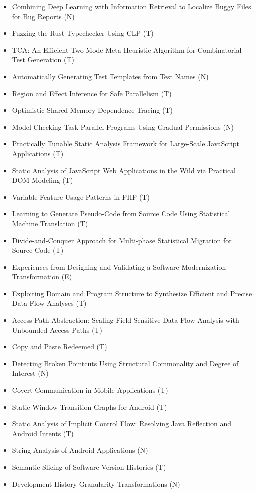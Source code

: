 {\begin{itemize}[itemsep=-1ex]
  \item Combining Deep Learning with Information Retrieval to Localize Buggy Files for Bug Reports (N)
  \item Fuzzing the Rust Typechecker Using CLP (T)
  \item TCA: An Efficient Two-Mode Meta-Heuristic Algorithm for Combinatorial Test Generation (T)
  \item Automatically Generating Test Templates from Test Names (N)
  \item Region and Effect Inference for Safe Parallelism (T)
  \item Optimistic Shared Memory Dependence Tracing (T)
  \item Model Checking Task Parallel Programs Using Gradual Permissions (N)
  \item Practically Tunable Static Analysis Framework for Large-Scale JavaScript Applications (T)
  \item Static Analysis of JavaScript Web Applications in the Wild via Practical DOM Modeling (T)
  \item Variable Feature Usage Patterns in PHP (T)
  \item Learning to Generate Pseudo-Code from Source Code Using Statistical Machine Translation (T)
  \item Divide-and-Conquer Approach for Multi-phase Statistical Migration for Source Code (T)
  \item Experiences from Designing and Validating a Software Modernization Transformation (E)
  \item Exploiting Domain and Program Structure to Synthesize Efficient and Precise Data Flow Analyses (T)
  \item Access-Path Abstraction: Scaling Field-Sensitive Data-Flow Analysis with Unbounded Access Paths (T)
  \item Copy and Paste Redeemed (T)
  \item Detecting Broken Pointcuts Using Structural Commonality and Degree of Interest (N)
  \item Covert Communication in Mobile Applications (T)
  \item Static Window Transition Graphs for Android (T)
  \item Static Analysis of Implicit Control Flow: Resolving Java Reflection and Android Intents (T)
  \item String Analysis of Android Applications (N)
  \item Semantic Slicing of Software Version Histories (T)
  \item Development History Granularity Transformations (N)

\end{itemize}}
